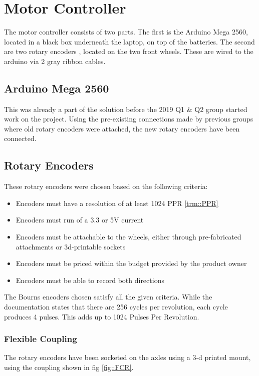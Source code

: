 \section{Motor Controller}
The motor controller consists of two parts.
The first is the Arduino Mega 2560, located in a black box underneath the laptop, on top of the batteries.
The second are two rotary encoders \cite{roten}, located on the two front wheels.
These are wired to the arduino via 2 gray ribbon cables.

\subsection{Arduino Mega 2560}
This was already a part of the solution before the 2019 Q1 \& Q2 group started work on the project.
Using the pre-existing connections made by previous groups where old rotary encoders were attached, the new rotary encoders have been connected.

\subsection{Rotary Encoders}
These rotary encoders were chosen based on the following criteria:

\begin{itemize}
\item Encoders must have a resolution of at least 1024 PPR \ref{trm::PPR}
\item Encoders must run of a 3.3 or 5V current
\item Encoders must be attachable to the wheels, either through pre-fabricated attachments or 3d-printable sockets
\item Encoders must be priced within the budget provided by the product owner
\item Encoders must be able to record both directions
\end{itemize}

The Bourns encoders chosen satisfy all the given criteria.
While the documentation states that there are 256 cycles per revolution, each cycle produces 4 pulses.
This adds up to 1024 Pulses Per Revolution.


\subsubsection{Flexible Coupling}
The rotary encoders have been socketed on the axles using a 3-d printed mount, using the coupling shown in fig \ref{fig::FCR}.

